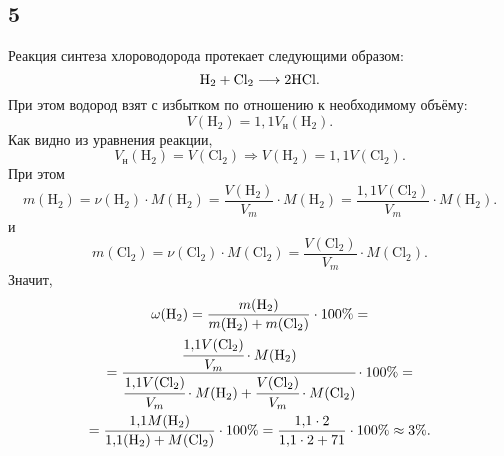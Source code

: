 \subsection{5}

Реакция синтеза хлороводорода протекает следующими образом:
\[
\rm H_2+Cl_2\longrightarrow 2HCl.
\]
При этом водород взят с избытком по отношению к необходимому объёму:
\[
V(\mathrm{H_2})=1{,}1V_\text{н}(\mathrm{H_2}).
\]
Как видно из уравнения реакции,
\[
V_\text{н}(\mathrm{H_2})=V(\mathrm{Cl_2})\Rightarrow V(\mathrm{H_2})=1{,}1V(\mathrm{Cl_2}).
\]
При этом
\[
m(\mathrm{H_2})=\nu(\mathrm{H_2})\cdot M(\mathrm{H_2})=\frac{V(\mathrm{H_2})}{V_m}\cdot M(\mathrm{H_2})=\frac{1{,}1V(\mathrm{Cl_2})}{V_m}\cdot M(\mathrm{H_2}).
\]
и
\[
m(\mathrm{Cl_2})=\nu(\mathrm{Cl_2})\cdot M(\mathrm{Cl_2})=\frac{V(\mathrm{Cl_2})}{V_m}\cdot M(\mathrm{Cl_2}).
\]
Значит,
\begin{multline*}
\omega(\mathrm{H_2})=\frac{m(\mathrm{H_2})}{m(\mathrm{H_2})+m(\mathrm{Cl_2})}\cdot100\%= \\
=\cfrac{\cfrac{1{,}1V(\mathrm{Cl_2})}{V_m}\cdot M(\mathrm{H_2})}{\cfrac{1{,}1V(\mathrm{Cl_2})}{V_m}\cdot M(\mathrm{H_2})+\cfrac{V(\mathrm{Cl_2})}{V_m}\cdot M(\mathrm{Cl_2})}\cdot100\%= \\
=\frac{1{,}1M(\mathrm{H_2})}{1{,}1(\mathrm{H_2})+M(\mathrm{Cl_2})}\cdot100\%=\frac{1{,}1\cdot2}{1{,}1\cdot2+71}\cdot100\%\approx3\%.
\end{multline*}